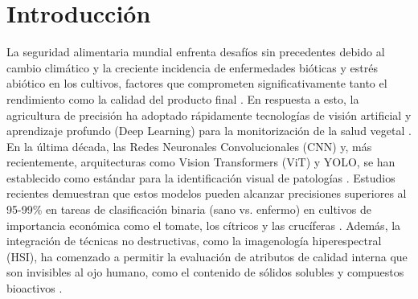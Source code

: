 \documentclass[agriculture,article,submit,pdftex,moreauthors]{Definitions/mdpi}
\begin{document}



\section{Introducción}

La seguridad alimentaria mundial enfrenta desafíos sin precedentes debido al cambio climático y la creciente incidencia de enfermedades bióticas y estrés abiótico en los cultivos, factores que comprometen significativamente tanto el rendimiento como la calidad del producto final \citep{Mansoor2025a,Mushtaq2025}. En respuesta a esto, la agricultura de precisión ha adoptado rápidamente tecnologías de visión artificial y aprendizaje profundo (Deep Learning) para la monitorización de la salud vegetal \citep{Mushtaq2025, Yang2025}. En la última década, las Redes Neuronales Convolucionales (CNN) y, más recientemente, arquitecturas como Vision Transformers (ViT) y YOLO, se han establecido como estándar para la identificación visual de patologías \citep{Devora-Guadarrama2025,Mansoor2025a,Rayed2023}. Estudios recientes demuestran que estos modelos pueden alcanzar precisiones superiores al 95-99\% en tareas de clasificación binaria (sano vs. enfermo) en cultivos de importancia económica como el tomate, los cítricos y las crucíferas \citep{Devora-Guadarrama2025,Mansoor2025a,Rayed2023}. Además, la integración de técnicas no destructivas, como la imagenología hiperespectral (HSI), ha comenzado a permitir la evaluación de atributos de calidad interna que son invisibles al ojo humano, como el contenido de sólidos solubles y compuestos bioactivos \citep{Zhang2025,Szechynska-Hebda2025}.
\end{document}

